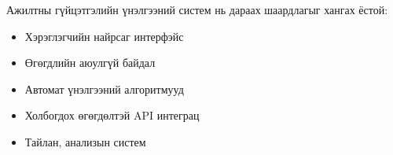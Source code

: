 Ажилтны гүйцэтгэлийн үнэлгээний систем нь дараах шаардлагыг хангах ёстой:
\begin{itemize}
    \item Хэрэглэгчийн найрсаг интерфэйс
    \item Өгөгдлийн аюулгүй байдал
    \item Автомат үнэлгээний алгоритмууд
    \item Холбогдох өгөгдөлтэй API интеграц
    \item Тайлан, анализын систем
\end{itemize}